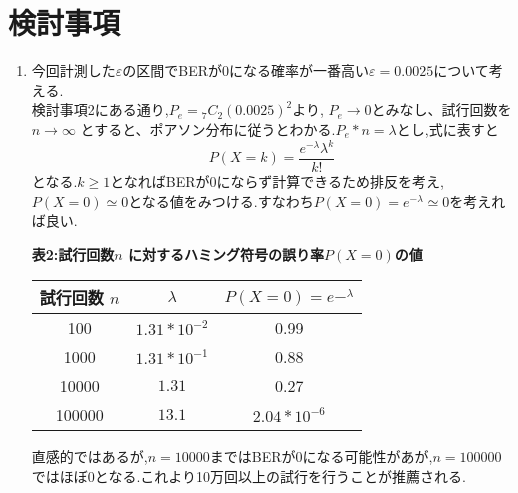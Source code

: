\documentclass[12pt]{jarticle}
\begin{document}
\section{検討事項}
\begin{enumerate}
\item 今回計測した$\varepsilon$の区間でBERが0になる確率が一番高い$\varepsilon = 0.0025$について考える.\\
  検討事項2にある通り,$P_e = {}_7C_2(0.0025)^2$より, $P_e \to 0$とみなし、試行回数を $n \to \infty$ とすると、ポアソン分布に従うとわかる.$P_e * n = \lambda$とし,式に表すと
  \begin{equation}
  P(X=k)=\frac{e^{-\lambda}{\lambda^k}}{k!}
  \end{equation}
  となる.$k\geq1$となればBERが0にならず計算できるため排反を考え,$P(X=0) \simeq 0$となる値をみつける.すなわち$P(X=0) = e^{-\lambda} \simeq 0$を考えれば良い.
  
  \begin{center}
    \textbf{表2:試行回数$n$ に対するハミング符号の誤り率$P(X=0)$の値}
    \begin{tabular}{|c|c|c|} \hline
      試行回数 $n$ & $\lambda$ & $P(X=0)=e-^{\lambda}$        \\ \hline
      100         &  $1.31 * 10^{-2}$ &  0.99                \\ \hline
      1000        &  $1.31 * 10^{-1}$ &  0.88                 \\ \hline
      10000       &  $1.31$          &  0.27                 \\ \hline
      100000      &  $13.1$          &  $2.04 * 10 ^{-6}$       \\ \hline
       \end{tabular}
  \end{center}

  直感的ではあるが,$n=10000$まではBERが0になる可能性があが,$n=100000$ではほぼ0となる.これより10万回以上の試行を行うことが推薦される.


\end{enumerate}
\end{document}
